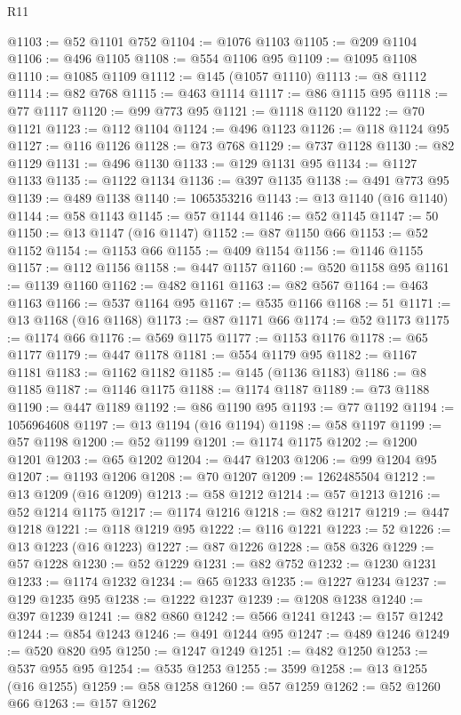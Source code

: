 \begin{lexlean}{R11}
\begin{coremodule}
@1103 := @52 @1101 @752
@1104 := @1076 @1103
@1105 := @209 @1104
@1106 := @496 @1105
@1108 := @554 @1106 @95
@1109 := @1095 @1108
@1110 := @1085 @1109
@1112 := @145 (@1057 @1110)
@1113 := @8 @1112
@1114 := @82 @768
@1115 := @463 @1114
@1117 := @86 @1115 @95
@1118 := @77 @1117
@1120 := @99 @773 @95
@1121 := @1118 @1120
@1122 := @70 @1121
@1123 := @112 @1104
@1124 := @496 @1123
@1126 := @118 @1124 @95
@1127 := @116 @1126
@1128 := @73 @768
@1129 := @737 @1128
@1130 := @82 @1129
@1131 := @496 @1130
@1133 := @129 @1131 @95
@1134 := @1127 @1133
@1135 := @1122 @1134
@1136 := @397 @1135
@1138 := @491 @773 @95
@1139 := @489 @1138
@1140 := 1065353216
@1143 := @13 @1140 (@16 @1140)
@1144 := @58 @1143
@1145 := @57 @1144
@1146 := @52 @1145
@1147 := 50
@1150 := @13 @1147 (@16 @1147)
@1152 := @87 @1150 @66
@1153 := @52 @1152
@1154 := @1153 @66
@1155 := @409 @1154
@1156 := @1146 @1155
@1157 := @112 @1156
@1158 := @447 @1157
@1160 := @520 @1158 @95
@1161 := @1139 @1160
@1162 := @482 @1161
@1163 := @82 @567
@1164 := @463 @1163
@1166 := @537 @1164 @95
@1167 := @535 @1166
@1168 := 51
@1171 := @13 @1168 (@16 @1168)
@1173 := @87 @1171 @66
@1174 := @52 @1173
@1175 := @1174 @66
@1176 := @569 @1175
@1177 := @1153 @1176
@1178 := @65 @1177
@1179 := @447 @1178
@1181 := @554 @1179 @95
@1182 := @1167 @1181
@1183 := @1162 @1182
@1185 := @145 (@1136 @1183)
@1186 := @8 @1185
@1187 := @1146 @1175
@1188 := @1174 @1187
@1189 := @73 @1188
@1190 := @447 @1189
@1192 := @86 @1190 @95
@1193 := @77 @1192
@1194 := 1056964608
@1197 := @13 @1194 (@16 @1194)
@1198 := @58 @1197
@1199 := @57 @1198
@1200 := @52 @1199
@1201 := @1174 @1175
@1202 := @1200 @1201
@1203 := @65 @1202
@1204 := @447 @1203
@1206 := @99 @1204 @95
@1207 := @1193 @1206
@1208 := @70 @1207
@1209 := 1262485504
@1212 := @13 @1209 (@16 @1209)
@1213 := @58 @1212
@1214 := @57 @1213
@1216 := @52 @1214 @1175
@1217 := @1174 @1216
@1218 := @82 @1217
@1219 := @447 @1218
@1221 := @118 @1219 @95
@1222 := @116 @1221
@1223 := 52
@1226 := @13 @1223 (@16 @1223)
@1227 := @87 @1226
@1228 := @58 @326
@1229 := @57 @1228
@1230 := @52 @1229
@1231 := @82 @752
@1232 := @1230 @1231
@1233 := @1174 @1232
@1234 := @65 @1233
@1235 := @1227 @1234
@1237 := @129 @1235 @95
@1238 := @1222 @1237
@1239 := @1208 @1238
@1240 := @397 @1239
@1241 := @82 @860
@1242 := @566 @1241
@1243 := @157 @1242
@1244 := @854 @1243
@1246 := @491 @1244 @95
@1247 := @489 @1246
@1249 := @520 @820 @95
@1250 := @1247 @1249
@1251 := @482 @1250
@1253 := @537 @955 @95
@1254 := @535 @1253
@1255 := 3599
@1258 := @13 @1255 (@16 @1255)
@1259 := @58 @1258
@1260 := @57 @1259
@1262 := @52 @1260 @66
@1263 := @157 @1262

\end{coremodule}
\end{lexlean}
